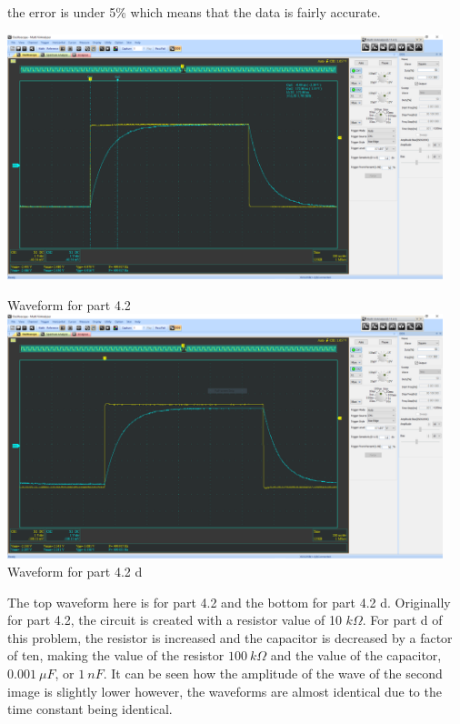\documentclass[12pt]{article}
\newcommand{\objects}[2]{%
  \leavevmode\vbox{\hbox{#1}\nointerlineskip\hbox{#2}}%
}
\begin{document}
    the error is under 5\% which means that the data is fairly accurate.
    \newpage
    \begin{center}
        \objects
            {\includegraphics[width=0.95\textwidth]{4.2.png}}
            \,
            Waveform for part 4.2
            {\includegraphics[width=0.95\textwidth]{4.2 d.png}}
            \,
            Waveform for part 4.2 d
    \end{center}
    \begin{center}
        The top waveform here is for part 4.2 and the bottom for part 4.2 d.  Originally for part 4.2, the circuit is created with a resistor value of 10 $ k\Omega $. For part d of this problem, the resistor is increased and the capacitor is decreased by a factor of ten, making the value of the resistor $ 100\ k\Omega $ and the value of the capacitor, $ 0.001\ \mu F$, or $ 1\ nF $.  It can be seen how the amplitude of the wave of the second image is slightly lower however, the waveforms are almost identical due to the time constant being identical.
    \end{center}
\end{document}
